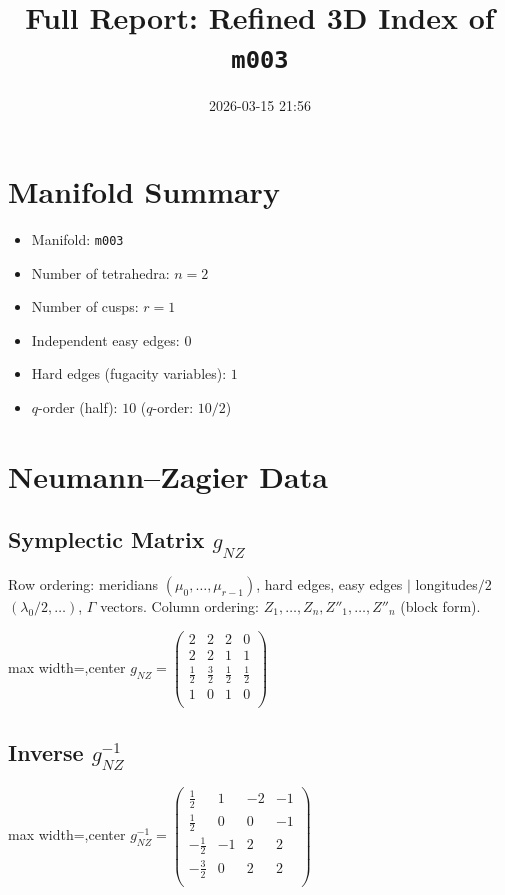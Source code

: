 \documentclass[11pt,a4paper]{article}
\title{Full Report: Refined 3D Index of \texttt{m003}}
\date{2026-03-15 21:56}
\begin{document}
\maketitle
\tableofcontents
\newpage

\section{Manifold Summary}
\begin{itemize}
  \item Manifold: \texttt{m003}
  \item Number of tetrahedra: $n = 2$
  \item Number of cusps: $r = 1$
  \item Independent easy edges: $0$
  \item Hard edges (fugacity variables): $1$
  \item $q$-order (half): $10$ \quad ($q$-order: $10/2$)
\end{itemize}

\section{Neumann--Zagier Data}
\subsection{Symplectic Matrix $g_{NZ}$}
Row ordering: meridians $(\mu_0,\ldots,\mu_{r-1})$, hard edges, easy edges $\mid$ longitudes$/2$ $(\lambda_0/2,\ldots)$, $\Gamma$ vectors.
Column ordering: $Z_1,\ldots,Z_n, Z''_1,\ldots,Z''_n$ (block form).

\begin{adjustbox}{max width=\linewidth,center}
$\displaystyle g_{NZ} = 
\left(\begin{array}{cccc}
2 & 2 & 2 & 0 \\
2 & 2 & 1 & 1 \\
\frac{1}{2} & \frac{3}{2} & \frac{1}{2} & \frac{1}{2} \\
1 & 0 & 1 & 0 \\
\end{array}\right)$
\end{adjustbox}

\subsection{Inverse $g_{NZ}^{-1}$}
\begin{adjustbox}{max width=\linewidth,center}
$\displaystyle g_{NZ}^{-1} = 
\left(\begin{array}{cccc}
\frac{1}{2} & 1 & -2 & -1 \\
\frac{1}{2} & 0 & 0 & -1 \\
-\frac{1}{2} & -1 & 2 & 2 \\
-\frac{3}{2} & 0 & 2 & 2 \\
\end{array}\right)$
\end{adjustbox}
\end{document}
